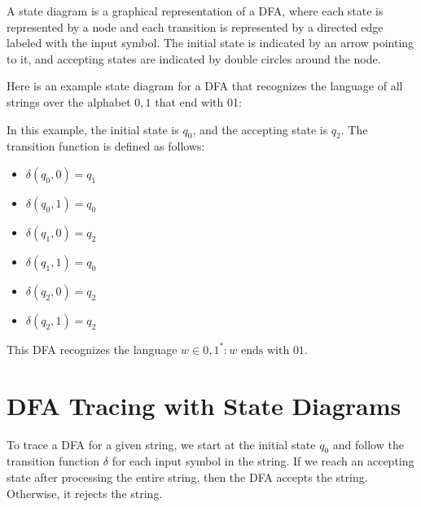 \documentclass{article}
\begin{document}
A state diagram is a graphical representation of a DFA, where each state is represented by a node and each transition is represented by a directed edge labeled with the input symbol. The initial state is indicated by an arrow pointing to it, and accepting states are indicated by double circles around the node.

Here is an example state diagram for a DFA that recognizes the language of all strings over the alphabet ${0,1}$ that end with 01:

\begin{center}
\end{center}

In this example, the initial state is $q_0$, and the accepting state is $q_2$. The transition function is defined as follows:

\begin{itemize}
\item $\delta(q_0,0) = q_1$
\item $\delta(q_0,1) = q_0$
\item $\delta(q_1,0) = q_2$
\item $\delta(q_1,1) = q_0$
\item $\delta(q_2,0) = q_2$
\item $\delta(q_2,1) = q_2$
\end{itemize}

This DFA recognizes the language ${w \in {0,1}^* : w \text{ ends with } 01}$.

\section{DFA Tracing with State Diagrams}

To trace a DFA for a given string, we start at the initial state $q_0$ and follow the transition function $\delta$ for each input symbol in the string. If we reach an accepting state after processing the entire string, then the DFA accepts the string. Otherwise, it rejects the string.
\end{document}
